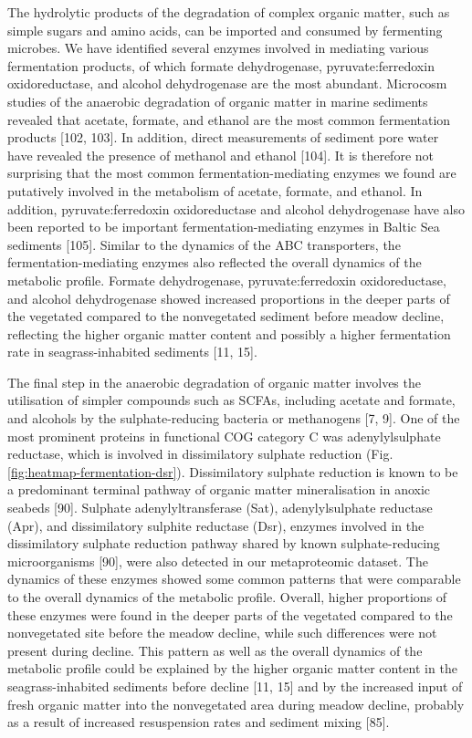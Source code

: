 \documentclass[
  12 pt,
]{article}
\begin{document}
The hydrolytic products of the degradation of complex organic matter, such as simple sugars and amino acids, can be imported and consumed by fermenting microbes. We have identified several enzymes involved in mediating various fermentation products, of which formate dehydrogenase, pyruvate:ferredoxin oxidoreductase, and alcohol dehydrogenase are the most abundant. Microcosm studies of the anaerobic degradation of organic matter in marine sediments revealed that acetate, formate, and ethanol are the most common fermentation products {[}102, 103{]}. In addition, direct measurements of sediment pore water have revealed the presence of methanol and ethanol {[}104{]}. It is therefore not surprising that the most common fermentation-mediating enzymes we found are putatively involved in the metabolism of acetate, formate, and ethanol. In addition, pyruvate:ferredoxin oxidoreductase and alcohol dehydrogenase have also been reported to be important fermentation-mediating enzymes in Baltic Sea sediments {[}105{]}. Similar to the dynamics of the ABC transporters, the fermentation-mediating enzymes also reflected the overall dynamics of the metabolic profile. Formate dehydrogenase, pyruvate:ferredoxin oxidoreductase, and alcohol dehydrogenase showed increased proportions in the deeper parts of the vegetated compared to the nonvegetated sediment before meadow decline, reflecting the higher organic matter content and possibly a higher fermentation rate in seagrass-inhabited sediments {[}11, 15{]}.

The final step in the anaerobic degradation of organic matter involves the utilisation of simpler compounds such as SCFAs, including acetate and formate, and alcohols by the sulphate-reducing bacteria or methanogens {[}7, 9{]}. One of the most prominent proteins in functional COG category C was adenylylsulphate reductase, which is involved in dissimilatory sulphate reduction (Fig. \ref{fig:heatmap-fermentation-dsr}). Dissimilatory sulphate reduction is known to be a predominant terminal pathway of organic matter mineralisation in anoxic seabeds {[}90{]}. Sulphate adenylyltransferase (Sat), adenylylsulphate reductase (Apr), and dissimilatory sulphite reductase (Dsr), enzymes involved in the dissimilatory sulphate reduction pathway shared by known sulphate-reducing microorganisms {[}90{]}, were also detected in our metaproteomic dataset. The dynamics of these enzymes showed some common patterns that were comparable to the overall dynamics of the metabolic profile. Overall, higher proportions of these enzymes were found in the deeper parts of the vegetated compared to the nonvegetated site before the meadow decline, while such differences were not present during decline. This pattern as well as the overall dynamics of the metabolic profile could be explained by the higher organic matter content in the seagrass-inhabited sediments before decline {[}11, 15{]} and by the increased input of fresh organic matter into the nonvegetated area during meadow decline, probably as a result of increased resuspension rates and sediment mixing {[}85{]}.
\end{document}
